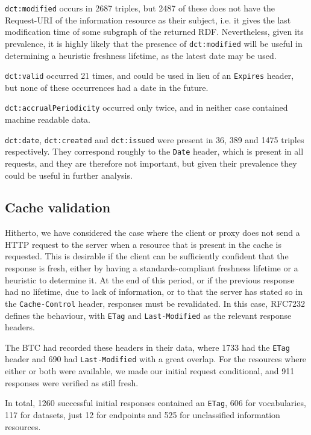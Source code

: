 \documentclass{llncs}
\newcommand{\rdfterm}[1]{\texttt{#1}}
\newcommand{\httph}[1]{\texttt{#1}}
\begin{document}
\rdfterm{dct:modified} occurs in 2687 triples, but 2487 of these does
not have the Request-URI of the information resource as their subject,
i.e. it gives the last modification time of some subgraph of the
returned RDF. Nevertheless, given its prevalence, it is highly likely
that the presence of \rdfterm{dct:modified} will be useful in
determining a heuristic freshness lifetime, as the latest date may be
used.

\rdfterm{dct:valid} occurred 21 times, and could be used in lieu of an
\httph{Expires} header, but none of these occurrences had a date in the
future. 

\rdfterm{dct:accrualPeriodicity} occurred only twice, and in neither
case contained machine readable data.

\rdfterm{dct:date}, \rdfterm{dct:created} and \rdfterm{dct:issued}
were present in 36, 389 and 1475 triples respectively. They correspond
roughly to the \httph{Date} header, which is present in all requests,
and they are therefore not important, but given their prevalence they
could be useful in further analysis.

\subsection{Cache validation}

Hitherto, we have considered the case where the client or proxy does
not send a HTTP request to the server when a resource that is present
in the cache is requested. This is desirable if the client can be
sufficiently confident that the response is fresh, either by having a
standards-compliant freshness lifetime or a heuristic to determine
it. At the end of this period, or if the previous response had no
lifetime, due to lack of information, or to that the server has stated
so in the \httph{Cache-Control} header, responses must be
revalidated. In this case, RFC7232 defines the behaviour, with
\httph{ETag} and \httph{Last-Modified} as the relevant response
headers.

The BTC had recorded these headers in their data, where 1733 had the
\httph{ETag} header and 690 had \httph{Last-Modified} with a great
overlap. For the resources where either or both were available, we
made our initial request conditional, and 911 responses were verified
as still fresh. 

In total, 1260 successful initial responses contained
an \httph{ETag}, 606 for vocabularies, 117 for datasets, just 12 for
endpoints and 525 for unclassified information resources.
\end{document}

